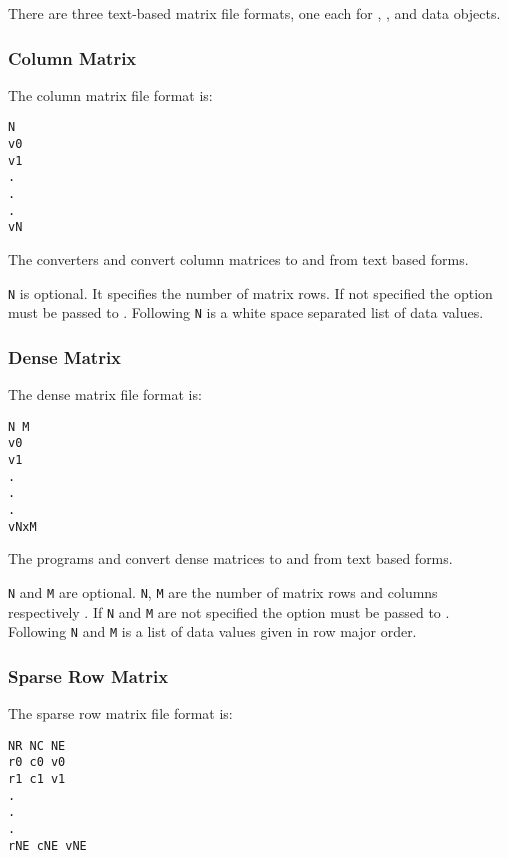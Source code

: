 There are three text-based matrix file formats, one each for
, , and
 data objects.


\subsubsection{Column Matrix}

The  column matrix file format is:

\begin{verbatim}
N
v0 
v1
.
.
.
vN
\end{verbatim}

The converters  and  
convert column matrices to and from text based forms.

\verb|N| is optional.  It specifies the number of matrix rows.  If not
specified the  option must be passed to
.  Following \verb|N| is a white space
separated list of data values.


\subsubsection{Dense Matrix}

The dense matrix file format is:

\begin{verbatim}
N M
v0
v1
.
.
.
vNxM
\end{verbatim}

The programs  and  
convert dense matrices to and from text based forms.

\verb|N| and \verb|M| are optional.  \verb|N|, \verb|M| are the number
of matrix rows and columns respectively .  If \verb|N| and \verb|M|
are not specified the  option must be
passed to .  Following \verb|N| and
\verb|M| is a list of data values given in row major order.


\subsubsection{Sparse Row Matrix}

The sparse row matrix file format is:

\begin{verbatim}
NR NC NE
r0 c0 v0
r1 c1 v1
.
.
.
rNE cNE vNE
\end{verbatim}

